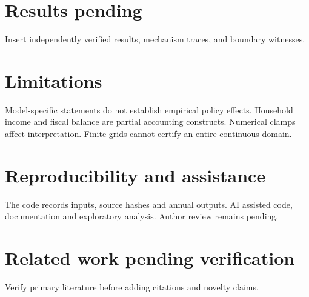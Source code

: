 \documentclass[11pt]{article}
\begin{document}
\section{Results pending}
Insert independently verified results, mechanism traces, and boundary witnesses.
\section{Limitations}
Model-specific statements do not establish empirical policy effects. Household
income and fiscal balance are partial accounting constructs. Numerical clamps
affect interpretation. Finite grids cannot certify an entire continuous domain.
\section{Reproducibility and assistance}
The code records inputs, source hashes and annual outputs. AI assisted code,
documentation and exploratory analysis. Author review remains pending.
\section{Related work pending verification}
Verify primary literature before adding citations and novelty claims.
\end{document}
